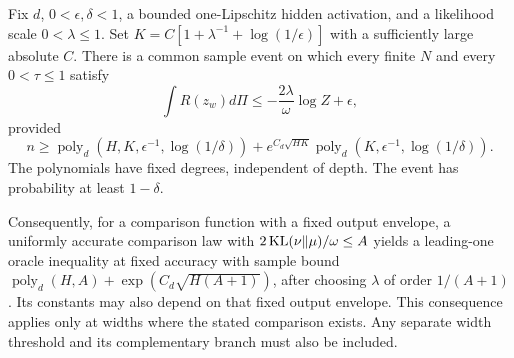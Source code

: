 \begin{proposition}
\label{prop:sobolev-oracle}
Fix $d$, $0<\epsilon,\delta<1$, a bounded one-Lipschitz hidden activation, and a likelihood scale $0<\lambda\le1$. Set
$K=C[1+\lambda^{-1}+\log(1/\epsilon)]$ with a sufficiently large absolute $C$.
There is a common sample event on which every finite $N$ and every $0<\tau\le1$ satisfy
\begin{equation}
 \int R(z_w)d\Pi\le
 -\frac{2\lambda}{\omega}\log Z+\epsilon,
 \label{eq:sobolev-certificate}
\end{equation}
provided
\begin{equation}
 n\ge \operatorname{poly}_d(H,K,\epsilon^{-1},\log(1/\delta))
       +e^{C_d\sqrt{HK}}
          \operatorname{poly}_d(K,\epsilon^{-1},\log(1/\delta)).
 \label{eq:sobolev-budget}
\end{equation}
The polynomials have fixed degrees, independent of depth. The event has probability at least $1-\delta$.

Consequently, for a comparison function with a fixed output envelope, a uniformly accurate comparison law with
$2\operatorname{KL}(\nu\Vert\mu)/\omega\le A$ yields a leading-one oracle inequality at fixed accuracy with sample bound
$\operatorname{poly}_d(H,A)+\exp(C_d\sqrt{H(A+1)})$, after choosing $\lambda$ of order $1/(A+1)$. Its constants may also depend on that fixed output envelope. This consequence applies only at widths where the stated comparison exists. Any separate width threshold and its complementary branch must also be included.
\end{proposition}
